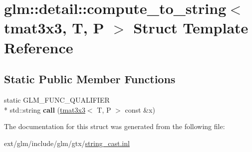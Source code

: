 \hypertarget{structglm_1_1detail_1_1compute__to__string_3_01tmat3x3_00_01_t_00_01_p_01_4}{\section{glm\-:\-:detail\-:\-:compute\-\_\-to\-\_\-string$<$ tmat3x3, T, P $>$ Struct Template Reference}
\label{structglm_1_1detail_1_1compute__to__string_3_01tmat3x3_00_01_t_00_01_p_01_4}
}
\subsection*{Static Public Member Functions}
\begin{DoxyCompactItemize}
\item 
\hypertarget{structglm_1_1detail_1_1compute__to__string_3_01tmat3x3_00_01_t_00_01_p_01_4_a30955bc053389846e9f0a7a7154babb7}{static G\-L\-M\-\_\-\-F\-U\-N\-C\-\_\-\-Q\-U\-A\-L\-I\-F\-I\-E\-R \\*
std\-::string {\bfseries call} (\hyperlink{structglm_1_1tmat3x3}{tmat3x3}$<$ T, P $>$ const \&x)}\label{structglm_1_1detail_1_1compute__to__string_3_01tmat3x3_00_01_t_00_01_p_01_4_a30955bc053389846e9f0a7a7154babb7}

\end{DoxyCompactItemize}


The documentation for this struct was generated from the following file\-:\begin{DoxyCompactItemize}
\item 
ext/glm/include/glm/gtx/\hyperlink{string__cast_8inl}{string\-\_\-cast.\-inl}\end{DoxyCompactItemize}
